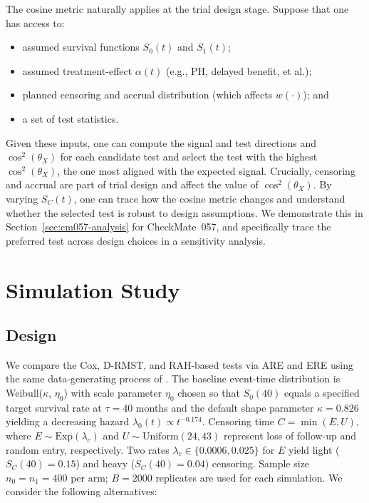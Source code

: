 \documentclass[12pt]{article}
\begin{document}
The cosine metric naturally applies at the trial design stage. Suppose that one has access to:
\begin{itemize}
\item assumed survival functions $S_0(t)$ and $S_1(t)$;
\item assumed treatment-effect $\alpha(t)$ (e.g., PH, delayed
benefit, et al.);
\item planned censoring and accrual distribution (which affects $w(\cdot)$); and
\item a set of test statistics.
\end{itemize}
Given these inputs, one can compute the signal and test directions and $\cos^2(\theta_X)$ for each candidate test and select the test with the highest $\cos^2(\theta_X)$, the one most aligned with the expected signal. Crucially, censoring and accrual are part of trial design and affect the value of $\cos^2(\theta_X).$ By varying $S_C(t)$, one can trace how the cosine metric changes and understand whether the selected test is robust to design assumptions. We demonstrate this in Section~\ref{sec:cm057-analysis} for CheckMate~057, and specifically trace the preferred test across design choices in a sensitivity analysis.




\section{Simulation Study}
\label{sec:sim}

\subsection{Design}
\label{sec:sim-design}

We compare the Cox, D-RMST, and RAH-based tests via ARE and ERE using the
same data-generating process of \citet{Tian2018}.
The baseline event-time distribution is Weibull($\kappa$, $\eta_0$)
with scale parameter $\eta_0$ chosen so that $S_0(40)$ equals a specified target survival rate at  $\tau=40$ months and the default shape parameter $\kappa=0.826$ yielding a decreasing hazard
$\lambda_0(t)\propto t^{-0.174}$.
Censoring time $C=\min(E,U)$, where $E\sim\mathrm{Exp}(\lambda_c)$ and
$U\sim\mathrm{Uniform}(24,43)$ represent loss of follow-up and random entry, respectively. Two rates $\lambda_c\in\{0.0006,0.025\}$ for $E$
yield light ($S_C(40)=0.15$) and heavy ($S_C(40)=0.04$)
censoring.
Sample size $n_0=n_1=400$ per arm; $B=2000$ replicates are used for each simulation. We consider the following alternatives:
\end{document}
